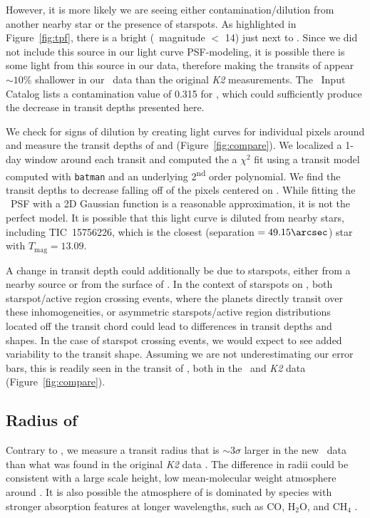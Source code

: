 \documentclass[linenumbers,modern,twocolumn]{aastex631}
\begin{document}
However, it is more likely we are seeing either contamination/dilution from another nearby star or the presence of starspots. As highlighted in Figure~\ref{fig:tpf}, there is a bright (\tess\ magnitude $<$ 14) just next to \sname. Since we did not include this source in our light curve PSF-modeling, it is possible there is some light from this source in our data, therefore making the transits of \planetknown appear $\sim 10$\% shallower in our \tess\ data than the original \textit{K2} measurements. The \tess\ Input Catalog \citep{stassun18} lists a contamination value of 0.315 for \sname, which could sufficiently produce the decrease in transit depths presented here. 

We check for signs of dilution by creating light curves for individual pixels around \sname and measure the transit depths of \planetb and \planete (Figure~\ref{fig:compare}). We localized a 1-day window around each transit and computed the a $\chi^2$ fit using a transit model computed with \texttt{batman} \citep{Kreidberg15} and an underlying 2\textsuperscript{nd} order polynomial. We find the transit depths to decrease falling off of the pixels centered on \sname. While fitting the \tess\ PSF with a 2D Gaussian function is a reasonable approximation, it is not the perfect model. It is possible that this light curve is diluted from nearby stars, including TIC~15756226, which is the closest (separation $= 49.15\arcsec$) star with $T_\textrm{mag} = 13.09$.

A change in transit depth could additionally be due to starspots, either from a nearby source or from the surface of \sname. In the context of starspots on \sname, both starspot/active region crossing events, where the planets directly transit over these inhomogeneities, or asymmetric starspots/active region distributions located off the transit chord could lead to differences in transit depths and shapes. In the case of starspot crossing events, we would expect to see added variability to the transit shape. Assuming we are not underestimating our error bars, this is readily seen in the transit of \planetb, both in the \tess\ and \textit{K2} data (Figure~\ref{fig:compare}). 


\subsection{Radius of \planete}

Contrary to \planetknown, we measure a transit radius that is $\sim 3\sigma$ larger in the new \tess\ data than what was found in the original \textit{K2} data \citep{David2019a}. The difference in radii could be consistent with a large scale height, low mean-molecular weight atmosphere around \planete \citep{deMooij12}. It is also possible the atmosphere of \planete is dominated by species with stronger absorption features at longer wavelengths, such as CO, H$_2$O, and CH$_4$ \citep{carter09}. 
\end{document}
